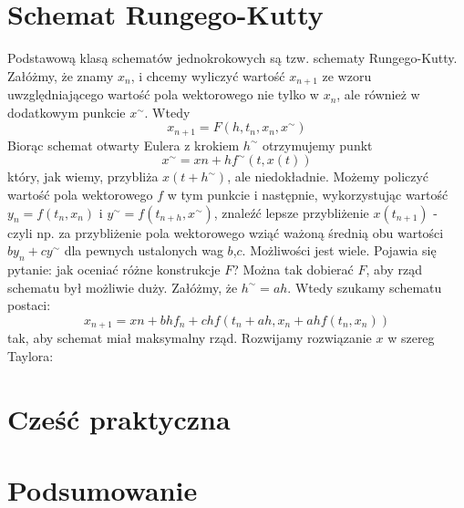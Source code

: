 \documentclass[12pt,a4paper]{report}
\begin{document}
\chapter{Schemat  Rungego-Kutty}
Podstawową klasą schematów jednokrokowych są tzw. schematy Rungego-Kutty. 
Załóżmy, że znamy $x_n$, i chcemy wyliczyć wartość $x_{n+1}$ ze wzoru uwzględniającego wartość
pola wektorowego nie tylko w $x_n$, ale również w dodatkowym punkcie 
$x^{\sim}$. Wtedy
\begin{equation*}
x_{n+1} = F(h,t_n,x_n,x^{\sim})
\end{equation*}
\newline
Biorąc schemat otwarty Eulera z krokiem $h^{\sim}$ otrzymujemy punkt
\begin{equation*}
x^{\sim} = xn + h f^{\sim}(t,x(t))
\end{equation*}
\newline
który, jak wiemy, przybliża $x(t+h^{\sim})$, ale niedokładnie. Możemy policzyć wartość pola wektorowego $f$ w tym punkcie i następnie, wykorzystując wartość $y_n = f(t_n, x_n)$ i $y^{\sim} = f(t_{n+h},x^{\sim})$, znaleźć lepsze przybliżenie $x(t_{n+1})$ - czyli np. za przybliżenie pola wektorowego wziąć ważoną średnią obu wartości $by_n+cy^{\sim}$ dla pewnych ustalonych wag $b$,$c$. Możliwości
jest wiele. Pojawia się pytanie: jak oceniać różne konstrukcje $F$? Można tak dobierać $F$, aby rząd schematu był możliwie duży. 
\newline
Załóżmy, że $h^{\sim}=ah$. Wtedy szukamy schematu postaci:
\begin{equation*}
x_{n+1} = xn + bhf_n + chf(t_n + ah, x_n + ahf(t_n,x_n))
\end{equation*}
\newline
tak, aby schemat miał maksymalny rząd.
\newline
Rozwijamy rozwiązanie $x$ w szereg Taylora:







\chapter{Cześć praktyczna}

\chapter{Podsumowanie}



\end{document}
